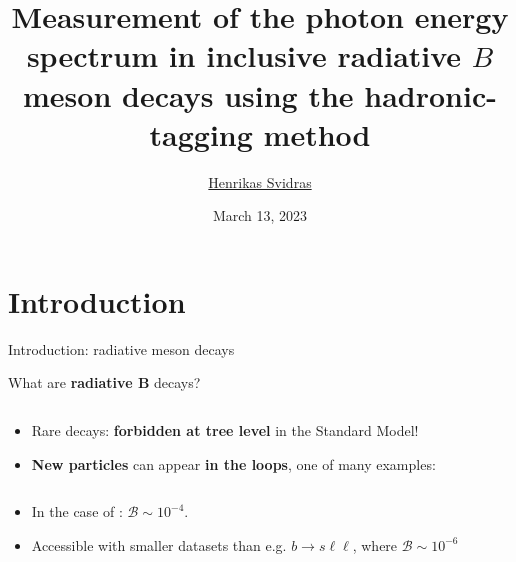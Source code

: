 \documentclass[xcolor=dvipsnames]{beamer}
\title[\meeting]{Measurement of the photon energy spectrum in
inclusive radiative \texorpdfstring{$B$}{B} meson decays using the
hadronic-tagging method} %
\author[Henrikas Svidras]{\texorpdfstring{\footnotesize \underline{Henrikas Svidras}}{Henrikas Svidras}} %
\institute[DESY] %
{
\text{\large \meeting}
\vspace{-10pt}
}
\date{March 13, 2023} %
\begin{document}
{ 
\begin{frame}
\titlepage %
\end{frame}
}
\addtocounter{framenumber}{-1}

\section{Introduction}
\begin{frame}{Introduction: radiative \safeB meson decays}
\centering\small
{\normalsize What are \textbf{radiative $\bm{B}$} decays?
\begin{columns}
   
   
\end{columns}
}

\begin{itemize}
   \item Rare decays: \textbf{forbidden at tree level} in the Standard Model!
   \item \textbf{New particles} can appear \textbf{in the loops}, one of many examples:
\end{itemize}
{\normalsize
\begin{columns}
   
\end{columns}
}
\begin{itemize}
   \item In the case of \btosgamma: $\mathcal{B}\sim10^{-4}$.
   \item[\ra] Accessible with smaller datasets than e.g. $b\to s\ell\ell$, where $\mathcal{B}\sim10^{-6}$
\end{itemize}

\end{frame}
\end{document}
